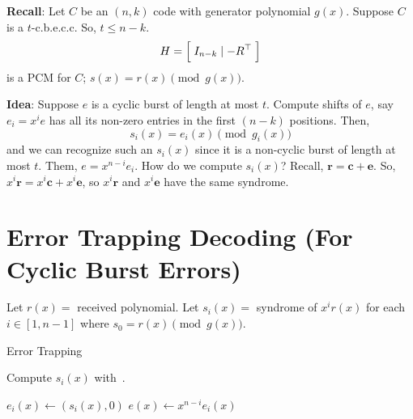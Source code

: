 \textbf{Recall}: Let $ C $ be an $ (n,k) $ code with generator polynomial
$ g(x) $. Suppose $ C $ is a $ t $-c.b.e.c.c. So, $ t\leqslant n-k $.
\[ H= \Bigl[\; I_{n-k}\mid -R^\top \;\Bigr] \]
is a PCM for $ C $; $ s(x)=r(x)\pmod{g(x)} $.

\textbf{Idea}: Suppose $ e $ is a cyclic burst of length at most $ t $.
Compute shifts of $ e $, say $ e_i=x^i e $ has all its non-zero entries in the first
$ (n-k) $ positions. Then,
\[ s_i(x)=e_i(x)\pmod{g_i(x)} \]
and we can recognize such an $ s_i(x) $ since it is a non-cyclic burst of length
at most $ t $. Them, $ e=x^{n-i}e_i $. How do we compute $ s_i(x) $? Recall,
$ \symbf{r}=\symbf{c}+\symbf{e} $. So, $ x^i \symbf{r}=x^i\symbf{c}+x^i\symbf{e} $, so
$ x^i \symbf{r} $ and $ x^i\symbf{e} $ have the same syndrome.

\section{Error Trapping Decoding (For Cyclic Burst Errors)}
Let $ r(x)= $ received polynomial. Let $ s_i(x)= $ syndrome of $ x^i r(x) $ for
each $ i\in[1,n-1] $ where $ s_0=r(x)\pmod{g(x)} $.

\begin{algorithm}
    \DontPrintSemicolon{}
    \caption{Error Trapping}

     {
        Compute $ s_i(x) $ with~.

         {
            $ e_i(x)\gets(s_i(x),0) $\;
            $ e(x)\gets x^{n-i}e_i(x) $\;
        }
    }
    \Return{}
\end{algorithm}

